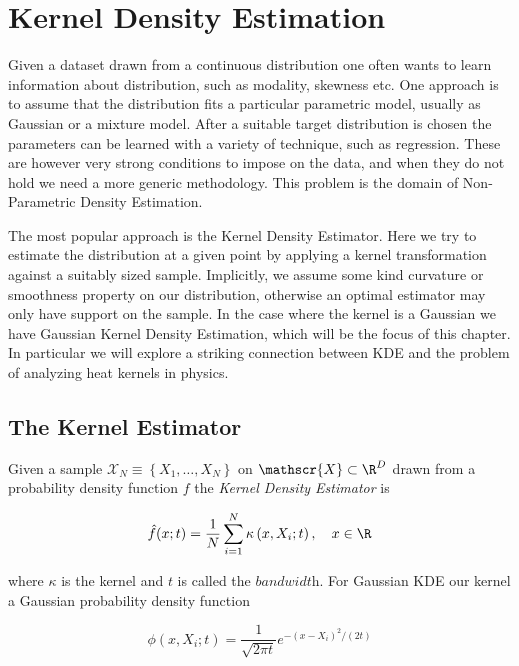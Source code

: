
\section{Kernel Density Estimation}


Given a dataset drawn from a continuous distribution one often wants to learn information about distribution, such as modality, skewness etc. One approach is to assume that the distribution fits a particular parametric model, usually as Gaussian or a mixture model. After a suitable target distribution is chosen the parameters can be learned with a variety of technique, such as regression. These are however very strong conditions to impose on the data, and when they do not hold we need a more generic methodology. This problem is the domain of Non-Parametric Density Estimation. 

The most popular approach is the Kernel Density Estimator. Here we try to estimate the distribution at a given point by applying a kernel transformation against a suitably sized sample. Implicitly, we assume some kind curvature or smoothness property on our distribution, otherwise an optimal estimator may only have support on the sample. In the case where the kernel is a Gaussian we have Gaussian Kernel Density Estimation, which will be the focus of this chapter. In particular we will explore a striking connection between KDE and the problem of analyzing heat kernels in physics.

\subsection{The Kernel Estimator}
Given a sample $\mathcal{X}_{N} \equiv\left\{X_{1}, \ldots, X_{N}\right\}$ on $\mathscr{X} \subset \R^D$ drawn from a probability density function $f$ the \textit{Kernel Density Estimator} is

\begin{equation}
\hat{f}(x ; t)=\frac{1}{N} \sum_{i=1}^{N} \kappa\left(x, X_{i} ; t\right), \quad x \in \R
\end{equation}

where $\kappa$ is the kernel and $t$ is called the $\textit{bandwidth}$. For Gaussian KDE our kernel a Gaussian probability density function 

\[
\phi\left(x, X_{i} ; t\right)=\frac{1}{\sqrt{2 \pi t}} e^{-\left(x-X_{i}\right)^{2} /(2 t)}
\]

